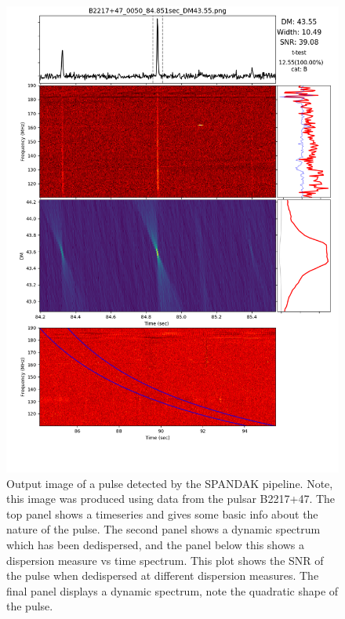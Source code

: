 \documentclass[12pt, onepage]{article}
\numberwithin{equation}{section} %
\begin{document}
\begin{figure}
    \centering
    \includegraphics[width=0.8\linewidth]{B_0050_84.851sec_DM43.55.png}
    \caption{Output image of a pulse detected by the SPANDAK pipeline. Note, this image was produced using data from the pulsar B2217+47. The top panel shows a timeseries and gives some basic info about the nature of the pulse. The second panel shows a dynamic spectrum which has been dedispersed, and the panel below this shows a dispersion measure vs time spectrum. This plot shows the SNR of the pulse when dedispersed at different dispersion measures. The final panel displays a dynamic spectrum, note the quadratic shape of the pulse.}
    \label{fig:my_label}
\end{figure}
\end{document}

